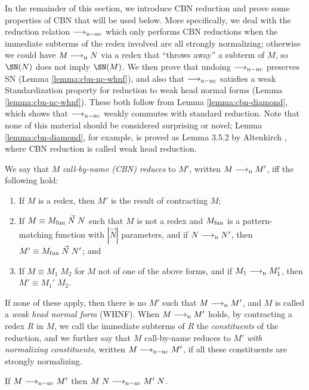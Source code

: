 \documentclass{article}
\begin{document}
In the remainder of this section, we introduce CBN reduction and
prove some properties of CBN that will be used below.  More
specifically, we deal with the reduction relation $\longrightarrow_{\mathrm{n-nc}}$ which
only performs CBN reductions when the immediate subterms of the redex
involved are all strongly normalizing; otherwise we could have
$M\longrightarrow_{\mathrm{n}} N$ via a redex that ``throws away'' a subterm of $M$, so
$\SN(N)$ does not imply $\SN(M)$.  We then prove that undoing
$\longrightarrow_{\mathrm{n-nc}}$ preserves SN (Lemma \ref{lemma:cbn-nc-whnf}), and also
that $\longrightarrow_{\mathrm{n-nc}}$ satisfies a weak Standardization property for
reduction to weak head normal forms (Lemma \ref{lemma:cbn-nc-whnf}).
These both follow from Lemma \ref{lemma:cbn-diamond}, which shows that
$\longrightarrow_{\mathrm{n-nc}}$ weakly commutes with standard reduction. Note that none
of this material should be considered surprising or novel; Lemma
\ref{lemma:cbn-diamond}, for example, is proved as Lemma 3.5.2 by
Altenkirch \cite{altenkirch93}, where CBN reduction is called weak
head reduction.


\begin{definition}
  \label{def:cbn}
  We say that $M$ \emph{call-by-name (CBN) reduces} to $M'$, written
  $M\longrightarrow_{\mathrm{n}} M'$, iff the following hold:
  \begin{enumerate}
  \item If $M$ is a redex, then $M'$ is the result of contracting $M$;
  \item If $M\equiv M_{\mathrm{fun}}\;\vec{N}\;N$ such that $M$ is not a redex and
    $M_{\mathrm{fun}}$ is a pattern-matching function with $|\vec{N}|$
    parameters, and if $N\longrightarrow_{\mathrm{n}} N'$, then
    $M'\equiv M_{\mathrm{fun}}\;\vec{N}\;N'$; and
  \item If $M\equiv M_1\;M_2$ for $M$ not of one of the above forms,
    and if $M_1\longrightarrow_{\mathrm{n}} M_1'$, then $M'\equiv M_1'\;M_2$.
  \end{enumerate}
  If none of these apply, then there is no $M'$ such that
  $M\longrightarrow_{\mathrm{n}} M'$, and $M$ is called a \emph{weak head normal form}
  (WHNF). When $M\longrightarrow_{\mathrm{n}} M'$ holds, by contracting a redex $R$ in
  $M$, we call the immediate subterms of $R$ the \emph{constituents}
  of the reduction, and we further say that $M$ call-by-name reduces
  to $M'$ \emph{with normalizing constituents}, written $M\longrightarrow_{\mathrm{n-nc}}
  M'$, if all these constituents are strongly normalizing.
\end{definition}

\begin{lemma}
  \label{lemma:cbn-nc-app}
  If $M\longrightarrow_{\mathrm{n-nc}} M'$ then $M\;N\longrightarrow_{\mathrm{n-nc}} M'\;N$.
\end{lemma}
\end{document}
